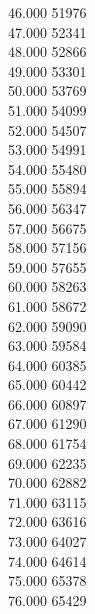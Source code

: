 { 46.000	51976 \\
 47.000	52341 \\
 48.000	52866 \\
 49.000	53301 \\
 50.000	53769 \\
 51.000	54099 \\
 52.000	54507 \\
 53.000	54991 \\
 54.000	55480 \\
 55.000	55894 \\
 56.000	56347 \\
 57.000	56675 \\
 58.000	57156 \\
 59.000	57655 \\
 60.000	58263 \\
 61.000	58672 \\
 62.000	59090 \\
 63.000	59584 \\
 64.000	60385 \\
 65.000	60442 \\
 66.000	60897 \\
 67.000	61290 \\
 68.000	61754 \\
 69.000	62235 \\
 70.000	62882 \\
 71.000	63115 \\
 72.000	63616 \\
 73.000	64027 \\
 74.000	64614 \\
 75.000	65378 \\
 76.000	65429 \\
}
